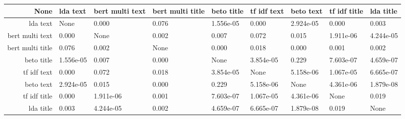 \begin{tabular}{|r|l|l|l|l|l|l|l|l|}
  \hline
  None & lda text & bert multi text & bert multi title & beto title & tf idf text & beto text & tf idf title & lda title \\ 
  \hline
  lda text & None & 0.000 & 0.076 & 1.556e-05 & 0.000 & 2.924e-05 & 0.000 & 0.003 \\ 
  \hline
  bert multi text & 0.000 & None & 0.002 & 0.007 & 0.072 & 0.015 & 1.911e-06 & 4.244e-05 \\ 
  \hline
  bert multi title & 0.076 & 0.002 & None & 0.000 & 0.018 & 0.000 & 0.001 & 0.002 \\ 
  \hline
  beto title & 1.556e-05 & 0.007 & 0.000 & None & 3.854e-05 & 0.229 & 7.603e-07 & 4.659e-07 \\ 
  \hline
  tf idf text & 0.000 & 0.072 & 0.018 & 3.854e-05 & None & 5.158e-06 & 1.067e-05 & 6.665e-07 \\ 
  \hline
  beto text & 2.924e-05 & 0.015 & 0.000 & 0.229 & 5.158e-06 & None & 4.361e-06 & 1.879e-08 \\ 
  \hline
  tf idf title & 0.000 & 1.911e-06 & 0.001 & 7.603e-07 & 1.067e-05 & 4.361e-06 & None & 0.019 \\ 
  \hline
  lda title & 0.003 & 4.244e-05 & 0.002 & 4.659e-07 & 6.665e-07 & 1.879e-08 & 0.019 & None \\ 
  \hline
\end{tabular}
